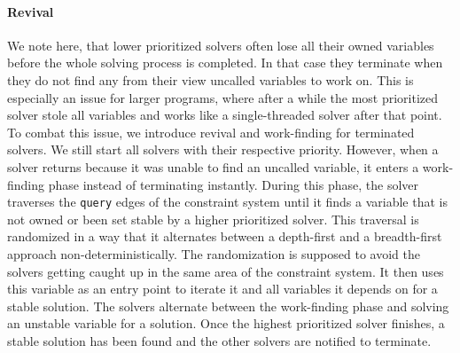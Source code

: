     \paragraph{Revival} We note here, that lower prioritized solvers often lose all their owned variables before the whole solving process is completed. In that case they terminate when they do not find any from their view uncalled variables to work on. This is especially an issue for larger programs, where after a while the most prioritized solver stole all variables and works like a single-threaded solver after that point. To combat this issue, we introduce revival and work-finding for terminated solvers.
    We still start all solvers with their respective priority. However, when a solver returns because it was unable to find an uncalled variable, it enters a work-finding phase instead of terminating instantly. During this phase, the solver traverses the \texttt{query} edges of the constraint system until it finds a variable that is not owned or been set stable by a higher prioritized solver. This traversal is randomized in a way that it alternates between a depth-first and a breadth-first approach non-deterministically. The randomization is supposed to avoid the solvers getting caught up in the same area of the constraint system. It then uses this variable as an entry point to iterate it and all variables it depends on for a stable solution. The solvers alternate between the work-finding phase and solving an unstable variable for a solution. Once the highest prioritized solver finishes, a stable solution has been found and the other solvers are notified to terminate.

